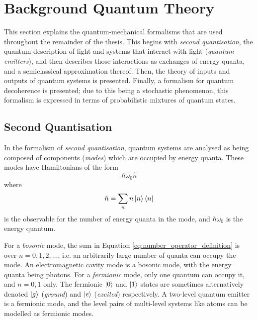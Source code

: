 \section{\label{sec:quantum_theory}Background Quantum Theory}
This section explains the quantum-mechanical formalisms that are used throughout the remainder of the thesis. This begins with \textit{second quantisation}, the quantum description of light and systems that interact with light (\textit{quantum emitters}), and then describes those interactions as exchanges of energy quanta, and a semiclassical approximation thereof. Then, the theory of inputs and outputs of quantum systems is presented. Finally, a formalism for quantum decoherence is presented; due to this being a stochastic phenomenon, this formalism is expressed in terms of probabilistic mixtures of quantum states.

\subsection{Second Quantisation}
In the formalism of \textit{second quantisation}, quantum systems are analysed as being composed of components (\textit{modes}) which are occupied by energy quanta. These modes have Hamiltonians of the form
\begin{equation}
    \hbar\omega_0\hat{n} \label{eq:second_quantisation_hamiltonian}
\end{equation}
where
\begin{equation}
    \hat{n} = \sum_n n\left|n\right\rangle\left\langle n\right| \label{eq:number_operator_definition}
\end{equation}
is the observable for the number of energy quanta in the mode, and $\hbar\omega_0$ is the energy quantum.

For a \textit{bosonic} mode, the sum in Equation \ref{eq:number_operator_definition} is over $n = 0, 1, 2, \dots$, i.e. an arbitrarily large number of quanta can occupy the mode. An electromagnetic cavity mode is a bosonic mode, with the energy quanta being photons. For a \textit{fermionic} mode, only one quantum can occupy it, and $n=0,1$ only. The fermionic $\left|0\right\rangle$ and $\left|1\right\rangle$ states are sometimes alternatively denoted $\left|g\right\rangle$ (\textit{ground}) and $\left|e\right\rangle$ (\textit{excited}) respectively. A two-level quantum emitter is a fermionic mode, and the level pairs of multi-level systems like atoms can be modelled as fermionic modes.

